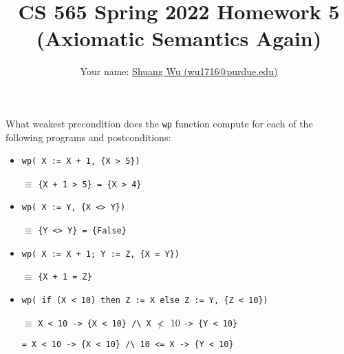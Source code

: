 \documentclass[12pt]{article}
\newenvironment{problem}[2][Problem]{\begin{trivlist}
\item[\hskip \labelsep {\bfseries #1}\hskip \labelsep {\bfseries #2.}]}{\end{trivlist}}
\begin{document}
\title{CS 565 Spring 2022 Homework 5 \\ (Axiomatic Semantics Again)}
\author{Your name: \underline{Shuang Wu (wu1716@purdue.edu)}}
\maketitle

\begin{problem}{1 (2 points)}
What weakest precondition does the \lstinline|wp| function compute for
each of the following programs and postconditions:

\begin{itemize}
\item[a. ]   \lstinline!wp( X := X + 1, {X > 5})!

$\equiv$ \lstinline!{X + 1 > 5} = {X > 4}!

\item[b. ]    \lstinline!wp( X := Y, {X <> Y})!

$\equiv$ \lstinline!{Y <> Y} = {False}!

\item[c. ]   \lstinline!wp( X := X + 1; Y := Z, {X = Y})!

$\equiv$ \lstinline!{X + 1 = Z}!

\item[d. ]   \lstinline!wp( if (X < 10) then Z := X else Z := Y, {Z < 10})!

$\equiv$ \lstinline!X < 10 -> {X < 10} /\ X! $\nless$ 10 \lstinline!-> {Y < 10}!

\lstinline!= X < 10 -> {X < 10} /\ 10 <= X -> {Y < 10}!

\end{itemize}
\end{problem}

\pagebreak
\end{document}
